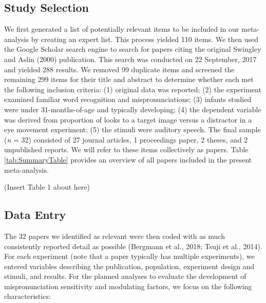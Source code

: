 \documentclass[man]{apa6}
\begin{document}
\hypertarget{study-selection}{%
\subsection{Study Selection}\label{study-selection}}

We first generated a list of potentially relevant items to be included in our meta-analysis by creating an expert list. This process yielded 110 items. We then used the Google Scholar search engine to search for papers citing the original Swingley and Aslin (2000) publication. This search was conducted on 22 September, 2017 and yielded 288 results. We removed 99 duplicate items and screened the remaining 299 items for their title and abstract to determine whether each met the following inclusion criteria: (1) original data was reported; (2) the experiment examined familiar word recognition and mispronunciations; (3) infants studied were under 31-months-of-age and typically developing; (4) the dependent variable was derived from proportion of looks to a target image versus a distractor in a eye movement experiment; (5) the stimuli were auditory speech. The final sample (\emph{n} = 32) consisted of 27 journal articles, 1 proceedings paper, 2 theses, and 2 unpublished reports. We will refer to these items collectively as papers. Table \ref{tab:SummaryTable} provides an overview of all papers included in the present meta-analysis.

(Insert Table 1 about here)

\hypertarget{data-entry}{%
\subsection{Data Entry}\label{data-entry}}

The 32 papers we identified as relevant were then coded with as much consistently reported detail as possible (Bergmann et al., 2018; Tsuji et al., 2014). For each experiment (note that a paper typically has multiple experiments), we entered variables describing the publication, population, experiment design and stimuli, and results. For the planned analyses to evaluate the development of mispronunciation sensitivity and modulating factors, we focus on the following characteristics:
\end{document}
